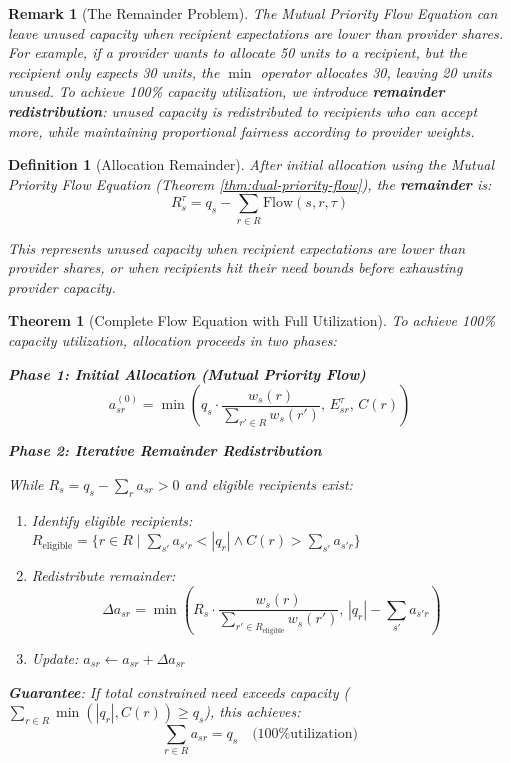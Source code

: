 \documentclass[11pt]{article}
\newtheorem{definition}{Definition}
\newtheorem{theorem}{Theorem}
\newtheorem{remark}{Remark}
\begin{document}
\begin{remark}[The Remainder Problem]
The Mutual Priority Flow Equation can leave unused capacity when recipient expectations are lower than provider shares. For example, if a provider wants to allocate 50 units to a recipient, but the recipient only expects 30 units, the $\min$ operator allocates 30, leaving 20 units unused. To achieve 100\% capacity utilization, we introduce \textbf{remainder redistribution}: unused capacity is redistributed to recipients who can accept more, while maintaining proportional fairness according to provider weights.
\end{remark}

\begin{definition}[Allocation Remainder]
After initial allocation using the Mutual Priority Flow Equation (Theorem \ref{thm:dual-priority-flow}), the \textbf{remainder} is:
\[
R_s^\tau = q_s - \sum_{r \in R} \text{Flow}(s, r, \tau)
\]

This represents unused capacity when recipient expectations are lower than provider shares, or when recipients hit their need bounds before exhausting provider capacity.
\end{definition}

\begin{theorem}[Complete Flow Equation with Full Utilization]
\label{thm:full-utilization-flow}
To achieve 100\% capacity utilization, allocation proceeds in two phases:

\textbf{Phase 1: Initial Allocation (Mutual Priority Flow)}
\[
a_{sr}^{(0)} = \min\left( q_s \cdot \frac{w_s(r)}{\sum_{r' \in R} w_s(r')}, \, E_{sr}^\tau, \, C(r) \right)
\]

\textbf{Phase 2: Iterative Remainder Redistribution}

While $R_s = q_s - \sum_r a_{sr} > 0$ and eligible recipients exist:
\begin{enumerate}
\item Identify eligible recipients: $R_{\text{eligible}} = \{ r \in R \mid \sum_{s'} a_{s'r} < |q_r| \land C(r) > \sum_{s'} a_{s'r} \}$
\item Redistribute remainder:
\[
\Delta a_{sr} = \min\left( R_s \cdot \frac{w_s(r)}{\sum_{r' \in R_{\text{eligible}}} w_s(r')}, \, |q_r| - \sum_{s'} a_{s'r} \right)
\]
\item Update: $a_{sr} \leftarrow a_{sr} + \Delta a_{sr}$
\end{enumerate}

\textbf{Guarantee}: If total constrained need exceeds capacity ($\sum_{r \in R} \min(|q_r|, C(r)) \geq q_s$), this achieves:
\[
\sum_{r \in R} a_{sr} = q_s \quad \text{(100\% utilization)}
\]
\end{theorem}
\end{document}

